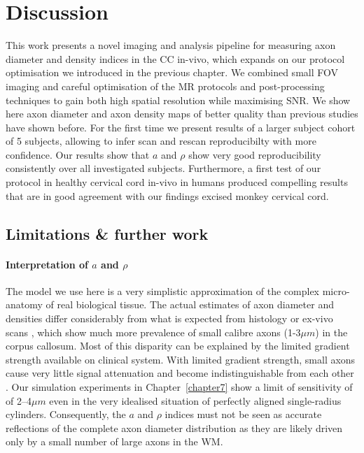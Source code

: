 \section{Discussion}
This work presents a novel imaging and analysis pipeline for measuring axon diameter and density indices in the CC in-vivo, which expands on our \SFasym{} protocol optimisation we introduced in the previous chapter. We combined small FOV imaging and careful optimisation of the MR protocols and post-processing techniques to gain both high spatial resolution while maximising SNR. We show here axon diameter and axon density maps of better quality than previous studies have shown before. For the first time we present results of a larger subject cohort of 5 subjects, allowing to infer scan and rescan reproducibilty with more confidence. Our results show that $a$ and $\rho$ show very good reproducibility consistently over all investigated subjects. Furthermore, a first test of our protocol in healthy cervical cord in-vivo in humans produced compelling results that are in good agreement with our findings excised monkey cervical cord.

\subsection{Limitations \& further work}
\paragraph{Interpretation of $a$ and $\rho$}The model we use here is a very simplistic approximation of the complex micro-anatomy of real biological tissue. The actual estimates of axon diameter and densities differ considerably from what is expected from histology or ex-vivo scans \citep{Alexander:2010}, which show much more prevalence of small calibre axons (1-3$\mu m$) in the corpus callosum. Most of this disparity can be explained by the limited gradient strength available on clinical system.  With limited gradient strength, small axons cause very little signal attenuation and become indistinguishable from each other \citep{Latt:2007,Yeh:2010}. Our simulation experiments in Chapter~\ref{chapter7} show a limit of sensitivity of of 2--4$\mu m$ even in the very idealised situation of perfectly aligned single-radius cylinders. Consequently, the $a$ and $\rho$ indices must not be seen as accurate reflections of the complete axon diameter distribution as they are likely driven only by a small number of large axons in the WM. 

